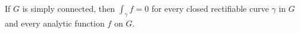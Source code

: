 If $G$ is simply connected, then $\int_{\gamma} f = 0$ for every closed rectifiable curve $\gamma$ in $G$ and every analytic function $f$ on $G$.
